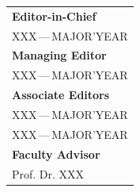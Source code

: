   \noindent
  \begin{tabular}{@{}l@{}}
    \textbf{Editor-in-Chief}\\
    XXX\,---\,{\color{cmjgray}MAJOR'YEAR}\\[0.3cm]
    \textbf{Managing Editor}\\
    XXX\,---\,{\color{cmjgray}MAJOR'YEAR}\\[0.3cm]
    \textbf{Associate Editors}\\
    XXX\,---\,{\color{cmjgray}MAJOR'YEAR} \\
    XXX\,---\,{\color{cmjgray}MAJOR'YEAR}\\[0.3cm]
    \textbf{Faculty Advisor}\\
    Prof. Dr. XXX %
  \end{tabular}
